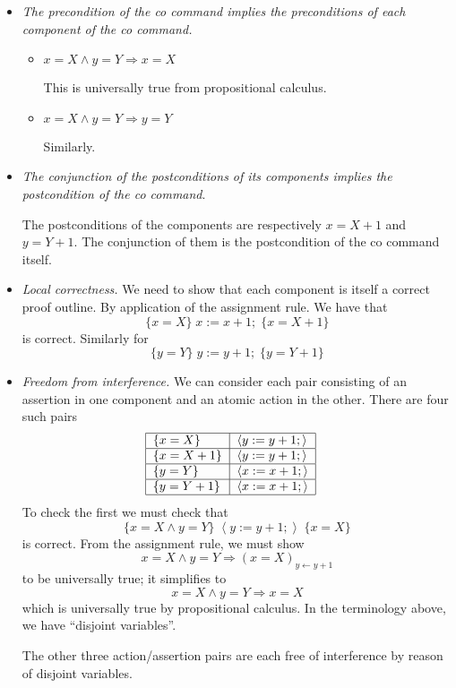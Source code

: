 \documentclass[11pt]{article}%
\begin{document}
\begin{itemize}
\item \emph{The precondition of the co command implies the preconditions of
each component of the co command.}

\begin{itemize}
\item $x=X\wedge y=Y\Rightarrow x=X$

This is universally true from propositional calculus.

\item $x=X\wedge y=Y\Rightarrow y=Y$

Similarly.
\end{itemize}

\item \emph{The conjunction of the postconditions of its components implies
the postcondition of the co command}$.$

The postconditions of the components are respectively $x=X+1$ and $y=Y+1$. The
conjunction of them is the postcondition of the co command itself.

\item \emph{Local correctness. }We need to show that each component is itself
a correct proof outline. By application of the assignment rule. We have that%
\[
\{x=X\}\;x:=x+1;\;\{x=X+1\}
\]
is correct. Similarly for%
\[
\{y=Y\}\;y:=y+1;\;\{y=Y+1\}
\]


\item \emph{Freedom from interference.} We can consider each pair consisting
of an assertion in one component and an atomic action in the other. There are
four such pairs%
\[%
\begin{tabular}
[c]{|l|l|}\hline
$\{x=X\}$ & $\left\langle y:=y+1;\right\rangle $\\\hline
$\{x=X+1\}$ & $\left\langle y:=y+1;\right\rangle $\\\hline
$\{y=Y\}$ & $\left\langle x:=x+1;\right\rangle $\\\hline
$\{y=Y+1\}$ & $\left\langle x:=x+1;\right\rangle $\\\hline
\end{tabular}
\ \ \
\]
To check the first we must check that%
\[
\{x=X\wedge y=Y\}\;\left\langle y:=y+1;\right\rangle \;\{x=X\}
\]
is correct. From the assignment rule, we must show%
\[
x=X\wedge y=Y\Rightarrow\left(  x=X\right)  _{y\leftarrow y+1}%
\]
to be universally true; it simplifies to
\[
x=X\wedge y=Y\Rightarrow x=X
\]
which is universally true by propositional calculus. In the terminology above,
we have \textquotedblleft disjoint variables\textquotedblright.

The other three action/assertion pairs are each free of interference by reason
of disjoint variables.
\end{itemize}
\end{document}
